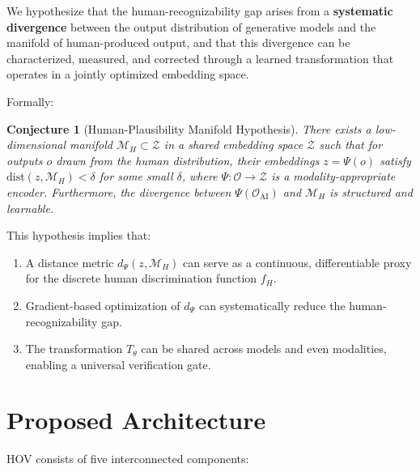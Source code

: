 \documentclass[12pt,oneside]{article}
\newtheorem{conjecture}[theorem]{Conjecture}
\begin{document}
We hypothesize that the human-recognizability gap arises from a \textbf{systematic divergence} between the output distribution of generative models and the manifold of human-produced output, and that this divergence can be characterized, measured, and corrected through a learned transformation that operates in a jointly optimized embedding space.

Formally:

\begin{conjecture}[Human-Plausibility Manifold Hypothesis]
There exists a low-dimensional manifold $\mathcal{M}_H \subset \mathcal{Z}$ in a shared embedding space $\mathcal{Z}$ such that for outputs $o$ drawn from the human distribution, their embeddings $z = \Psi(o)$ satisfy $\text{dist}(z, \mathcal{M}_H) < \delta$ for some small $\delta$, where $\Psi: \mathcal{O} \to \mathcal{Z}$ is a modality-appropriate encoder. Furthermore, the divergence between $\Psi(\mathcal{O}_\text{AI})$ and $\mathcal{M}_H$ is structured and learnable.
\end{conjecture}

This hypothesis implies that:
\begin{enumerate}[noitemsep]
    \item A distance metric $d_\Psi(z, \mathcal{M}_H)$ can serve as a continuous, differentiable proxy for the discrete human discrimination function $f_H$.
    \item Gradient-based optimization of $d_\Psi$ can systematically reduce the human-recognizability gap.
    \item The transformation $T_\theta$ can be shared across models and even modalities, enabling a universal verification gate.
\end{enumerate}

\section{Proposed Architecture}

HOV consists of five interconnected components:
\end{document}
